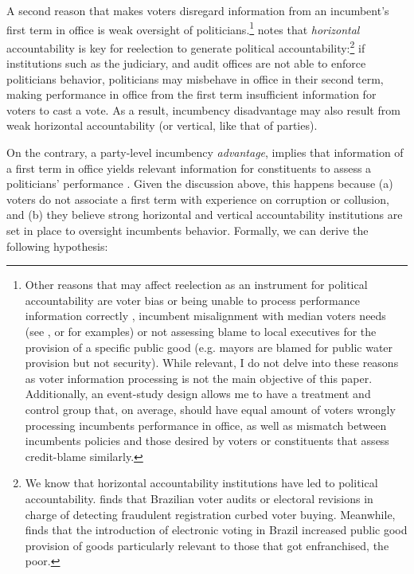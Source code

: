 \documentclass[12pt]{amsart}
\numberwithin{equation}{section}
\theoremstyle{definition}
\theoremstyle{definition}
\theoremstyle{definition}
\begin{document}
A second reason that makes voters disregard information from an incumbent's first term in office is weak oversight of politicians.\footnote{Other reasons that may affect reelection as an instrument for political accountability are voter bias or being unable to process performance information correctly \citep{dunning_etal_2019, bhandari_etal_2019}, incumbent misalignment with median voters needs (see \citet{adida_etal_2017}, \citet{boas_etal_2019} or \citet{dekadt_etal_2017} for examples) or not assessing blame to local executives for the provision of a specific public good (e.g. mayors are blamed for public water provision but not security). While relevant, I do not delve into these reasons as voter information processing is not the main objective of this paper. Additionally, an event-study design allows me to have a treatment and control group that, on average, should have equal amount of voters wrongly processing incumbents performance in office, as well as mismatch between incumbents policies and those desired by voters or constituents that assess credit-blame similarly.} \citet{weaver_2020} notes that \emph{horizontal} accountability is key for reelection to generate political accountability:\footnote{We know that horizontal accountability institutions have led to political accountability. \citet{hidalgo_etal_2015} finds that Brazilian voter audits or electoral revisions in charge of detecting fraudulent registration curbed voter buying. Meanwhile, \citet{fujiwara_2015} finds that the introduction of electronic voting in Brazil increased public good provision of goods particularly relevant to those that got enfranchised, the poor.} if institutions such as the judiciary, and audit offices are not able to enforce politicians behavior, politicians may misbehave in office in their second term, making performance in office from the first term insufficient information for voters to cast a vote. As a result, incumbency disadvantage may also result from weak horizontal accountability (or vertical, like that of parties). 


On the contrary, a party-level incumbency \emph{advantage}, implies that information of a first term in office yields relevant information for constituents to assess a politicians' performance \citep{weaver_2020}. Given the discussion above, this happens because (a) voters do not associate a first term with experience on corruption or collusion, and (b) they believe strong horizontal and vertical accountability institutions are set in place to oversight incumbents behavior. Formally, we can derive the following hypothesis:
 
\end{document}
